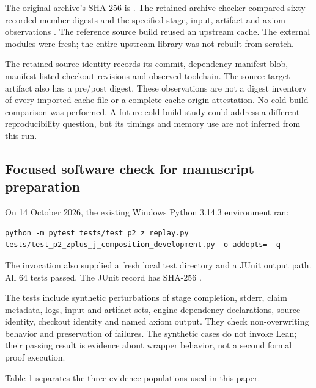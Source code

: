 \documentclass[11pt,a4paper]{article}
\begin{document}
The original archive's SHA-256 is . The retained archive checker compared sixty recorded member digests and the specified stage, input, artifact and axiom observations \cite{ref7,ref8}. The reference source build reused an upstream cache. The external modules were fresh; the entire upstream library was not rebuilt from scratch.

The retained source identity records its commit, dependency-manifest blob, manifest-listed checkout revisions and observed toolchain. The source-target artifact also has a pre/post digest. These observations are not a digest inventory of every imported cache file or a complete cache-origin attestation. No cold-build comparison was performed. A future cold-build study could address a different reproducibility question, but its timings and memory use are not inferred from this run.

\subsection{Focused software check for manuscript preparation}

On 14 October 2026, the existing Windows Python 3.14.3 environment ran:

\begin{lstlisting}
python -m pytest tests/test_p2_z_replay.py tests/test_p2_zplus_j_composition_development.py -o addopts= -q
\end{lstlisting}

The invocation also supplied a fresh local test directory and a JUnit output path. All 64 tests passed. The JUnit record has SHA-256 .

The tests include synthetic perturbations of stage completion, stderr, claim metadata, logs, input and artifact sets, engine dependency declarations, source identity, checkout identity and named axiom output. They check non-overwriting behavior and preservation of failures. The synthetic cases do not invoke Lean; their passing result is evidence about wrapper behavior, not a second formal proof execution.

Table 1 separates the three evidence populations used in this paper.
\end{document}
